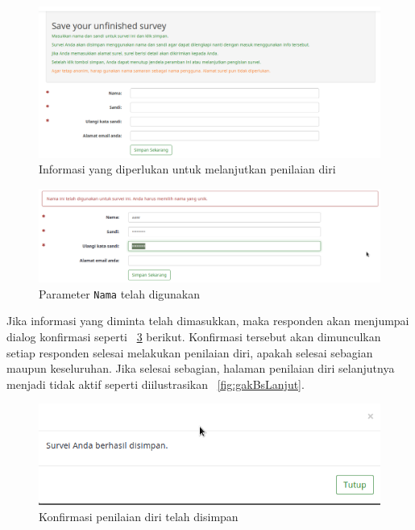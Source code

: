 \begin{figure}
  \begin{center}
    \includegraphics[scale=.35]{pics/lanjutLagi.png}
    \caption{Informasi yang diperlukan untuk melanjutkan penilaian diri}
    \label{fig:lanjutLagi}
  \end{center}
\end{figure}

\begin{figure}
  \begin{center}
    \includegraphics[scale=.5]{pics/lanjutLagi1.png}
    \caption{Parameter \texttt{Nama} telah digunakan}
    \label{fig:lanjutLagi1}
  \end{center}
\end{figure}

Jika informasi yang diminta telah dimasukkan, maka responden akan menjumpai dialog konfirmasi seperti \figurename~\ref{fig:surveyDisimpan} berikut. Konfirmasi tersebut akan dimunculkan setiap responden selesai melakukan penilaian diri, apakah selesai sebagian maupun keseluruhan. Jika selesai sebagian, halaman penilaian diri selanjutnya menjadi tidak aktif seperti diilustrasikan \figurename~\ref{fig:gakBsLanjut}.

\begin{figure}
   \begin{center}
     \includegraphics[scale=.5]{pics/surveyDisimpan.png}
     \caption{Konfirmasi penilaian diri telah disimpan}
     \label{fig:surveyDisimpan}
   \end{center}
 \end{figure} 
 
